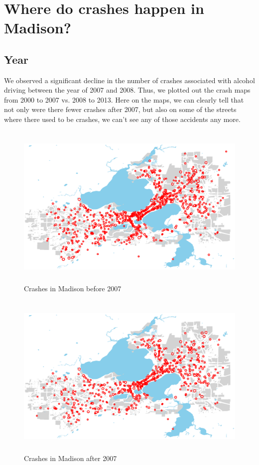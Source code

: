 \documentclass[15pt]{article}
\begin{document}
~\\
~\\
~\\

\section{Where do crashes happen in Madison?}
\subsection{Year}
We observed a significant decline in the number of crashes associated with alcohol driving between the year of 2007 and 2008. Thus, we plotted out the crash maps from 2000 to 2007 vs. 2008 to 2013. Here on the maps, we can clearly tell that not only were there fewer crashes after 2007, but also on some of the streets where there used to be crashes, we can’t see any of those accidents any more.
\begin{figure}[H]
\raggedleft
\includegraphics[height=80mm]{year1.eps}
\caption{Crashes in Madison before 2007}
\end{figure}

\begin{figure}[H]
\raggedleft
\includegraphics[height=80mm]{year2.eps}
\caption{Crashes in Madison after 2007}
\end{figure}
\end{document}
